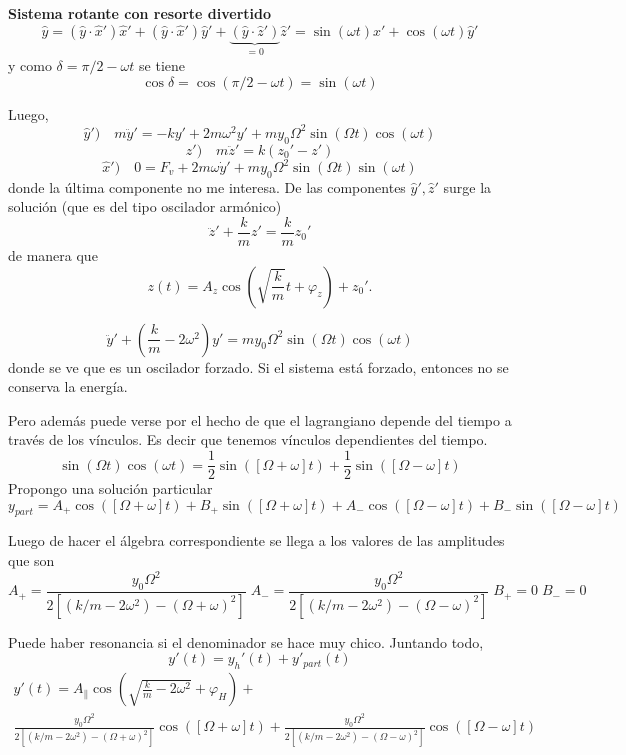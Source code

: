\documentclass[10pt,oneside]{CBFT_book}
\begin{document}
\begin{ejemplo}{\bf Sistema rotante con resorte divertido}
\[
	\hat{y} = (\hat{y}\cdot\hat{x}')\hat{x}' +  (\hat{y}\cdot\hat{x}')\hat{y}' + 
	\underbrace{(\hat{y}\cdot\hat{z}') }_{=0}\hat{z}'
	= \sin(\omega t) \hat{x}' + \cos(\omega t) \hat{y}'
\]
y como $\delta = \pi/2 - \omega t$ se tiene 
\[
	\cos \delta = \cos ( \pi/2 - \omega t ) = \sin ( \omega t )
\]

Luego,
\[
	\hat{y}' ) \quad m \ddot{y}' = -k y' + 2 m \omega^2 y' + m y_0 \Omega^2 \sin(\Omega t)\cos(\omega t)
\]
\[
	\hat{z}' ) \quad m \ddot{z}' = k ( z_0' - z' )
\]
\[
	\hat{x}' ) \quad 0 = F_v + 2m\omega \dot{y}' + m y_0 \Omega^2 \sin(\Omega t)\sin(\omega t)
\]
donde la última componente no me interesa.
De las componentes $\hat{y}',\hat{z}'$ surge la solución (que es del tipo oscilador armónico)
\[
	\ddot{z}' + \frac k m z' = \frac k m z_0'
\]
de manera que 
\[
	z(t) = A_z \cos\left( \sqrt{\frac{k}{m}} t + \varphi_z \right) + z_0'.
\]

\[
	\ddot{y}' + \left( \frac k m - 2\omega^2 \right) y' =  m y_0 \Omega^2 \sin( \Omega t) \cos (\omega t)
\]
donde se ve que es un oscilador forzado.
Si el sistema está forzado, entonces no se conserva la energía.

Pero además puede verse por el hecho de que el lagrangiano depende del tiempo a través de los vínculos. Es decir que
tenemos vínculos dependientes del tiempo.
\[
	\sin( \Omega t) \cos (\omega t) = \frac{1}{2} \sin( [\Omega + \omega] t ) +  \frac{1}{2} \sin( [\Omega - \omega] t )
\]
Propongo una solución particular 
\[
	y_{part} = A_+ \cos( [\Omega + \omega] t ) + B_+ \sin( [\Omega + \omega] t ) 
		+ A_- \cos([\Omega - \omega] t) + B_- \sin([\Omega - \omega] t)
\]

Luego de hacer el álgebra correspondiente se llega a los valores de las amplitudes que son 
\[
	A_+ = \frac{ y_0 \Omega^2 }{ 2[ ( k/m - 2 \omega^2 ) - (\Omega + \omega)^2 ] } \;
	A_- = \frac{ y_0 \Omega^2 }{ 2[ ( k/m - 2 \omega^2 ) - (\Omega - \omega)^2 ] } \; B_+=0 \; B_-=0
\]

Puede haber resonancia si el denominador se hace muy chico. Juntando todo,
\[
	y'(t) = y_h'(t) + y'_{part}(t)
\]
\begin{multline*}
	y'(t) = A_{\parallel} \cos\left( \sqrt{ \frac k m - 2 \omega^2 } + \varphi_H \right) + \\
	\frac{ y_0 \Omega^2 }{ 2[ ( k/m - 2 \omega^2 ) - (\Omega + \omega)^2 ] } \cos([\Omega +\omega] t ) + 
	\frac{ y_0 \Omega^2 }{ 2[ ( k/m - 2 \omega^2 ) - (\Omega - \omega)^2 ] } \cos([ \Omega - \omega ] t )
\end{multline*}
\end{ejemplo}
\end{document}
